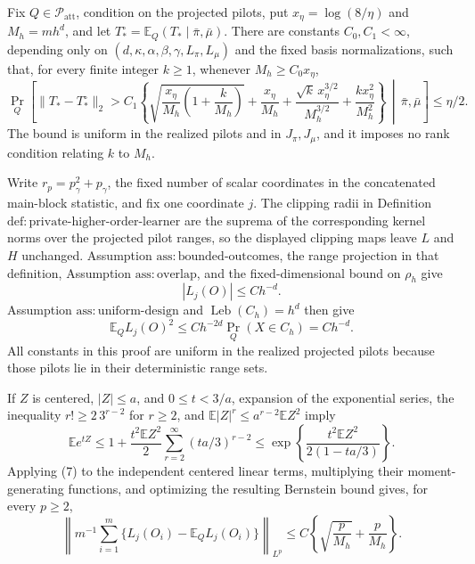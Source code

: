 Fix \(Q\in\mathcal P_{\mathrm{att}}\), condition on the projected pilots, put \(x_\eta=\log(8/\eta)\) and \(M_h=mh^d\), and let \(T_*^\circ=\mathbb E_Q(T_*\mid\bar\pi,\bar\mu)\).  There are constants \(C_0,C_1<\infty\), depending only on \((d,\kappa,\alpha,\beta,\gamma,L_\pi,L_\mu)\) and the fixed basis normalizations, such that, for every finite integer \(k\ge1\), whenever \(M_h\ge C_0x_\eta\),
\[
 \Pr_Q\!\left[
 \lVert T_*-T_*^\circ\rVert_2>C_1\left\{
 \sqrt{\frac{x_\eta}{M_h}\left(1+\frac{k}{M_h}\right)}
 +\frac{x_\eta}{M_h}
 +\frac{\sqrt{k}\,x_\eta^{3/2}}{M_h^{3/2}}
 +\frac{kx_\eta^2}{M_h^2}
 \right\}\,\middle|\,\bar\pi,\bar\mu\right]
 \le\eta/2.
\]
The bound is uniform in the realized pilots and in \(J_\pi,J_\mu\), and it imposes no rank condition relating \(k\) to \(M_h\).

Write \(r_p=p_\gamma^2+p_\gamma\), the fixed number of scalar coordinates in the concatenated main-block statistic, and fix one coordinate \(j\).  The clipping radii in Definition \(\mathrm{def{:}private\text{-}higher\text{-}order\text{-}learner}\) are the suprema of the corresponding kernel norms over the projected pilot ranges, so the displayed clipping maps leave \(L\) and \(H\) unchanged.  Assumption \(\mathrm{ass{:}bounded\text{-}outcomes}\), the range projection in that definition, Assumption \(\mathrm{ass{:}overlap}\), and the fixed-dimensional bound on \(\rho_h\) give
\[
 |L_j(O)|\le Ch^{-d}.
\]
Assumption \(\mathrm{ass{:}uniform\text{-}design}\) and \(\operatorname{Leb}(C_h)=h^d\) then give
\[
 \mathbb E_Q L_j(O)^2\le
 C h^{-2d}\Pr_Q(X\in C_h)=C h^{-d}.                         \tag{6}
\]
All constants in this proof are uniform in the realized projected pilots because those pilots lie in their deterministic range sets.

If \(Z\) is centered, \(|Z|\le a\), and \(0\le t<3/a\), expansion of the exponential series, the inequality \(r!\ge 2\,3^{r-2}\) for \(r\ge2\), and \(\mathbb E|Z|^r\le a^{r-2}\mathbb EZ^2\) imply
\[
 \mathbb E e^{tZ}
 \le 1+\frac{t^2\mathbb EZ^2}{2}
       \sum_{r=2}^{\infty}(ta/3)^{r-2}
 \le \exp\!\left\{\frac{t^2\mathbb EZ^2}{2(1-ta/3)}\right\}. \tag{7}
\]
Applying (7) to the independent centered linear terms, multiplying their moment-generating functions, and optimizing the resulting Bernstein bound gives, for every \(p\ge2\),
\[
 \left\lVert m^{-1}\sum_{i=1}^m
       \{L_j(O_i)-\mathbb E_Q L_j(O_i)\}\right\rVert_{L^p}
 \le C\left\{\sqrt{\frac p{M_h}}+\frac p{M_h}\right\}.       \tag{8}
\]

